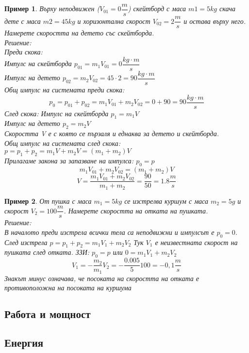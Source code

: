 \documentclass[fleqn]{article}
\newtheorem{example}{Пример}[subsection]
\begin{document}
\begin{example}
Върху неподвижен ($V_{01} = 0 \dfrac{m}{s}$) скейтборд с маса $m1 = 5 kg$ скача дете с маса $m2 = 45 kg$ и хоризонтална скорост
$V_{02} = 2 \dfrac{m}{s}$ и остава върху него. Намерете скоростта на детето със скейтборда.\\
Решение: \\
Преди скока:\\
Импулс на скейтборда $p_{01} = m_1 V_{01} = 0 \dfrac{kg \cdot m}{s}$ \\
Импулс на детето $p_{02} = m_2 V_{02} = 45 \cdot 2 = 90 \dfrac{kg \cdot m}{s} $ \\
Общ импулс на системата преди скока:
$$p_0 = p_{01} + p_{02} = m_1 V_{01} + m_2 V_{02} = 0 + 90 = 90 \dfrac{kg \cdot m}{s}$$
След скока:  
Импулс на скейтборда $p_1 = m_1 V $ \\
Импулс на детето $p_2 = m_2 V $\\
Скоростта V е с която се пързаля и еднаква за детето и скейтборда. \\
Общ импулс на системата след скока: $p = p_1 + p_2 = m_1 V +  m_2 V  = (m_1 + m_2)V$ \\
Прилагаме закона за запазване на импулса: $p_0 = p$
$$m_1 V_{01} + m_2 V_{02} = (m_1 + m_2)V $$
$$V = \dfrac{m_1 V_{01} + m_2 V_{02}}{m_1 + m_2} = \dfrac{90}{50} = 1.8 \dfrac{m}{s}$$

\end{example}

\begin{example}
От пушка с маса $m_1 = 5 kg$ се изстрелва куршум с маса $m_2 = 5 g$ и скорост $V_2 = 100 \dfrac{m}{s}$. Намерете скоростта на отката на пушката. \\
Решение: \\
В началото преди изстрела всички тела са неподвижни и импулсът е $p_0 = 0$. След изстрела $p = p_1 + p_2 = m_1V_1 + m_2V_2$ Тук $V_1$ е неизвестната скорост на пушката след отката. 
ЗЗИ: $p_0 = p$ или $0 =m_1V_1 + m_2V_2$
$$V_1 = -\dfrac{m_2}{m_1} V_2 = -\dfrac{0.005}{5} 100 = -0,1 \dfrac{m}{s}$$
Знакът минус означава, че посоката на скоростта на отката е противоположна на посоката на куршума
\end{example}

\subsection{Работа и мощност}

\subsection{Енергия}
\end{document}
